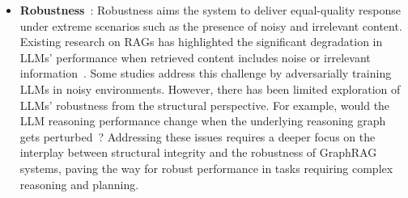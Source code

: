 \begin{itemize}[leftmargin=*]
\begin{itemize}
        \item \textbf{Robustness}~\cite{fang2024enhancing, xiang2024certifiably, xu2024unveil, yoran2023making, dziri2024faith, zhang2024darg, zhu2024dyval}: Robustness aims the system to deliver equal-quality response under extreme scenarios such as the presence of noisy and irrelevant content. Existing research on RAGs has highlighted the significant degradation in LLMs' performance when retrieved content includes noise or irrelevant information~\cite{yoran2023making, fang2024enhancing}. Some studies address this challenge by adversarially training LLMs in noisy environments. However, there has been limited exploration of LLMs' robustness from the structural perspective. For example, would the LLM reasoning performance change when the underlying reasoning graph gets perturbed~\cite{dziri2024faith, zhang2024darg, zhu2024dyval}? Addressing these issues requires a deeper focus on the interplay between structural integrity and the robustness of GraphRAG systems, paving the way for robust performance in tasks requiring complex reasoning and planning.
        
        


\end{itemize}
\end{itemize}
